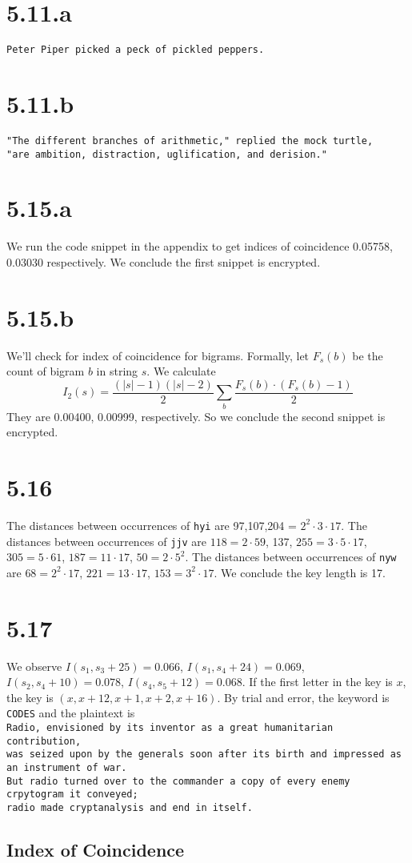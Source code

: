 \documentclass{article}
\begin{document}
\section*{5.11.a}
\verb|Peter Piper picked a peck of pickled peppers.|
\section*{5.11.b}
\verb|"The different branches of arithmetic," replied the mock turtle,|\\
\verb|"are ambition, distraction, uglification, and derision."|

\section*{5.15.a}
We run the code snippet in the appendix to get indices of coincidence 0.05758, 0.03030 respectively. We conclude the first snippet is encrypted.
\section*{5.15.b}
We'll check for index of coincidence for bigrams. Formally, let $F_s(b)$ be the count of bigram $b$ in string $s$. We calculate
$$I_2(s) = \frac{(|s|-1)(|s|-2)}{2}\sum\limits_b \frac{F_s(b) \cdot (F_s(b)-1)}{2}$$
They are 0.00400, 0.00999, respectively. So we conclude the second snippet is encrypted.

\section*{5.16}
The distances between occurrences of \verb|hyi| are 97,107,204 = $2^2 \cdot 3 \cdot 17$.
The distances between occurrences of \verb|jjv| are $118 = 2 \cdot 59$, 137, $255 = 3 \cdot 5 \cdot 17$, $305 = 5 \cdot 61$, $187 = 11 \cdot 17$, $50 = 2 \cdot 5^2$.
The distances between occurrences of \verb|nyw| are $68 = 2^2 \cdot 17$, $221 = 13 \cdot 17$, $153 = 3^2 \cdot 17$. We conclude the key length is 17.

\section*{5.17}
We observe $I(s_1,s_3+25) = 0.066$, $I(s_1,s_4+24) = 0.069$, $I(s_2,s_4+10) = 0.078$, $I(s_4,s_5+12) = 0.068$. If the first letter in the key is $x$, the key is $(x,x+12,x+1,x+2,x+16)$. By trial and error, the keyword is \verb|CODES| and the plaintext is\\
\verb|Radio, envisioned by its inventor as a great humanitarian contribution,|\\
\verb|was seized upon by the generals soon after its birth and impressed as an instrument of war.|\\
\verb|But radio turned over to the commander a copy of every enemy crpytogram it conveyed;|\\
\verb|radio made cryptanalysis and end in itself.|

\newpage
\begin{appendices}
\section{Index of Coincidence}

\end{appendices}
\end{document}
